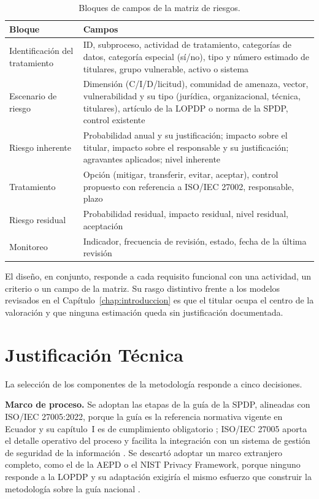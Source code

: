 \begin{table}[htbp]
  \centering
  \caption{Bloques de campos de la matriz de riesgos.}
  \label{tab:estructura_matriz}
  \footnotesize
  \renewcommand{\arraystretch}{1.2}
  \begin{tabularx}{\textwidth}{|p{2.8cm}|L|}
    \hline
    \textbf{Bloque} & \textbf{Campos} \\
    \hline
    Identificación del tratamiento & ID, subproceso, actividad de tratamiento, categorías de datos, categoría especial (sí/no), tipo y número estimado de titulares, grupo vulnerable, activo o sistema \\
    \hline
    Escenario de riesgo & Dimensión (C/I/D/licitud), comunidad de amenaza, vector, vulnerabilidad y su tipo (jurídica, organizacional, técnica, titulares), artículo de la LOPDP o norma de la SPDP, control existente \\
    \hline
    Riesgo inherente & Probabilidad anual y su justificación; impacto sobre el titular, impacto sobre el responsable y su justificación; agravantes aplicados; nivel inherente \\
    \hline
    Tratamiento & Opción (mitigar, transferir, evitar, aceptar), control propuesto con referencia a ISO/IEC 27002, responsable, plazo \\
    \hline
    Riesgo residual & Probabilidad residual, impacto residual, nivel residual, aceptación \\
    \hline
    Monitoreo & Indicador, frecuencia de revisión, estado, fecha de la última revisión \\
    \hline
  \end{tabularx}
  \raggedright
\end{table}

El diseño, en conjunto, responde a cada requisito funcional con una actividad, un criterio o un campo de la matriz. Su rasgo distintivo frente a los modelos revisados en el Capítulo~\ref{chap:introduccion} es que el titular ocupa el centro de la valoración y que ninguna estimación queda sin justificación documentada.

\section{Justificación Técnica}

La selección de los componentes de la metodología responde a cinco decisiones.

\textbf{Marco de proceso.} Se adoptan las etapas de la guía de la SPDP, alineadas con ISO/IEC 27005:2022, porque la guía es la referencia normativa vigente en Ecuador y su capítulo~I es de cumplimiento obligatorio \cite{spdp2025guia,spdp2026guiav2}; ISO/IEC 27005 aporta el detalle operativo del proceso y facilita la integración con un sistema de gestión de seguridad de la información \cite{iso27005_2022}. Se descartó adoptar un marco extranjero completo, como el de la AEPD o el NIST Privacy Framework, porque ninguno responde a la LOPDP y su adaptación exigiría el mismo esfuerzo que construir la metodología sobre la guía nacional \cite{aepd2021riesgo,nist2020privacy}.


